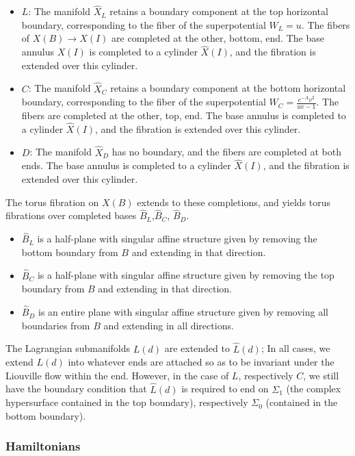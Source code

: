 \documentclass[12pt]{amsart}
\begin{document}
\begin{itemize}
\item $L$: The manifold $\hat{X}_L$ retains a boundary component at
  the top horizontal boundary, corresponding to the fiber of the
  superpotential $W_L = u$. The fibers of $X(B) \to X(I)$ are
  completed at the other, bottom, end. The base annulus $X(I)$ is
  completed to a cylinder $\hat{X}(I)$, and the fibration is extended
  over this cylinder.
\item $C$: The manifold $\hat{X}_C$ retains a boundary component at
  the bottom horizontal boundary, corresponding to the fiber of the
  superpotential $W_C = \frac{e^{-\Lambda}v^2}{uv-1}$. The fibers are
  completed at the other, top, end. The base annulus is completed to a
  cylinder $\hat{X}(I)$, and the fibration is extended over this cylinder.
\item $D$: The manifold $\hat{X}_D$ has no boundary, and the fibers are
  completed at both ends. The base annulus is completed to a
  cylinder $\hat{X}(I)$, and the fibration is extended over this cylinder.
\end{itemize}

The torus fibration on $X(B)$ extends to these completions, and yields
torus fibrations over completed bases $\hat{B}_L$,$\hat{B}_C$,
$\hat{B}_D$.
\begin{itemize}
\item $\hat{B}_L$ is a half-plane with singular affine structure given
  by removing the bottom boundary from $B$ and extending in that
  direction.
\item $\hat{B}_C$ is a half-plane with singular affine structure given
  by removing the top boundary from $B$ and extending in that
  direction.
\item $\hat{B}_D$ is an entire plane with singular affine structure
  given by removing all boundaries from $B$ and extending in all directions.
\end{itemize}

The Lagrangian submanifolds $L(d)$ are extended to $\hat{L}(d)$; In
all cases, we extend $L(d)$ into whatever ends are attached so as to
be invariant under the Liouville flow within the end. However, in the
case of $L$, respectively $C$, we still have the boundary condition
that $\hat{L}(d)$ is required to end on $\Sigma_1$ (the complex
hypersurface contained in the top boundary), respectively $\Sigma_0$
(contained in the bottom boundary).

\subsubsection{Hamiltonians}
\label{sec:hamiltonians}
\end{document}
